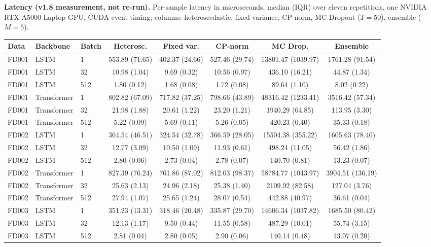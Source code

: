 \documentclass[10pt,a4paper]{article}
\begin{document}
\noindent\textbf{Latency (v1.8 measurement, not re-run).} Per-sample latency in microseconds, median (IQR) over eleven repetitions, one NVIDIA RTX A5000 Laptop GPU, CUDA-event timing; columns: heteroscedastic, fixed variance, CP-norm, MC Dropout ($T=50$), ensemble ($M=5$).
\begin{center}\scriptsize\begin{longtable}{lllccccc}\toprule Data & Backbone & Batch & Heterosc. & Fixed var. & CP-norm & MC Drop. & Ensemble \\ \midrule \endhead
FD001 & LSTM & 1 & 553.89 (71.65) & 402.37 (24.66) & 527.46 (29.74) & 13801.47 (1039.97) & 1761.28 (91.54) \\
FD001 & LSTM & 32 & 10.98 (1.04) & 9.69 (0.32) & 10.56 (0.97) & 436.10 (16.21) & 44.87 (1.34) \\
FD001 & LSTM & 512 & 1.80 (0.12) & 1.68 (0.08) & 1.72 (0.08) & 89.64 (1.10) & 8.02 (0.22) \\
FD001 & Transformer & 1 & 802.82 (67.09) & 717.82 (37.25) & 798.66 (43.89) & 48316.42 (1233.41) & 3516.42 (57.34) \\
FD001 & Transformer & 32 & 21.98 (1.88) & 20.61 (1.22) & 23.20 (1.21) & 1940.29 (64.85) & 113.95 (3.30) \\
FD001 & Transformer & 512 & 5.22 (0.09) & 5.69 (0.11) & 5.26 (0.05) & 420.23 (0.40) & 35.33 (0.18) \\
FD002 & LSTM & 1 & 364.54 (46.51) & 324.54 (32.78) & 366.59 (28.05) & 15504.38 (355.22) & 1605.63 (78.40) \\
FD002 & LSTM & 32 & 12.77 (3.09) & 10.50 (1.09) & 11.93 (0.61) & 498.24 (11.05) & 56.42 (1.86) \\
FD002 & LSTM & 512 & 2.80 (0.06) & 2.73 (0.04) & 2.78 (0.07) & 140.70 (0.81) & 13.23 (0.07) \\
FD002 & Transformer & 1 & 827.39 (76.24) & 761.86 (87.02) & 812.03 (98.37) & 58784.77 (1043.97) & 3904.51 (136.19) \\
FD002 & Transformer & 32 & 25.63 (2.13) & 24.96 (2.18) & 25.38 (1.40) & 2109.92 (82.58) & 127.04 (3.76) \\
FD002 & Transformer & 512 & 27.94 (1.07) & 25.65 (1.24) & 28.07 (0.54) & 442.88 (40.97) & 36.61 (0.04) \\
FD003 & LSTM & 1 & 351.23 (13.31) & 318.46 (20.48) & 335.87 (29.70) & 14606.34 (1037.82) & 1685.50 (80.42) \\
FD003 & LSTM & 32 & 12.13 (1.17) & 9.50 (0.44) & 11.55 (0.58) & 487.29 (10.01) & 55.74 (3.15) \\
FD003 & LSTM & 512 & 2.81 (0.04) & 2.80 (0.05) & 2.90 (0.06) & 140.14 (0.48) & 13.07 (0.20) \\

\end{longtable}
\end{center}
\end{document}
